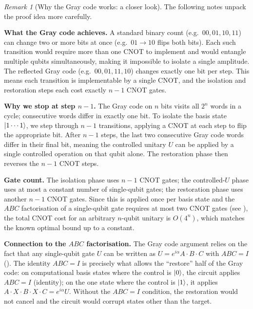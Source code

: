 \documentclass[12pt, a4paper, oneside]{report}
\theoremstyle{plain}
\theoremstyle{definition}
\theoremstyle{remark}
\newtheorem{remark}[theorem]{Remark}
\begin{document}
\begin{remark}[Why the Gray code works: a closer look]
	The following notes unpack the proof idea more carefully.

	\textbf{What the Gray code achieves.}
	A standard binary count (e.g.\ $00, 01, 10, 11$) can change two or more bits at once
	(e.g.\ $01 \to 10$ flips both bits). Each such transition would require more than one CNOT
	to implement and would entangle multiple qubits simultaneously, making it impossible to
	isolate a single amplitude. The reflected Gray code (e.g.\ $00, 01, 11, 10$) changes
	exactly one bit per step. This means each transition is implementable by a single CNOT,
	and the isolation and restoration steps each cost exactly $n-1$ CNOT gates.

	\textbf{Why we stop at step $n-1$.}
	The Gray code on $n$ bits visits all $2^n$ words in a cycle; consecutive words differ in
	exactly one bit. To isolate the basis state $\ket{1\cdots1}$, we step through $n-1$
	transitions, applying a CNOT at each step to flip the appropriate bit. After $n-1$ steps,
	the last two consecutive Gray code words differ in their final bit, meaning the controlled
	unitary $U$ can be applied by a single controlled operation on that qubit alone. The
	restoration phase then reverses the $n-1$ CNOT steps.

	\textbf{Gate count.}
	The isolation phase uses $n-1$ CNOT gates; the controlled-$U$ phase uses at most a constant
	number of single-qubit gates; the restoration phase uses another $n-1$ CNOT gates. Since
	this is applied once per basis state and the $ABC$ factorisation of a single-qubit gate
	requires at most two CNOT gates (see ), the total CNOT cost for an arbitrary
	$n$-qubit unitary is $O(4^n)$, which matches the known optimal bound up to a constant.

	\textbf{Connection to the $ABC$ factorisation.}
	The Gray code argument relies on the fact that any single-qubit gate $U$ can be written as
	$U = e^{i\alpha} A \cdot B \cdot C$ with $ABC = I$ (). The identity
	$ABC = I$ is precisely what allows the ``restore'' half of the Gray code: on computational
	basis states where the control is $\ket{0}$, the circuit applies $ABC = I$ (identity); on
	the one state where the control is $\ket{1}$, it applies
	$A \cdot X \cdot B \cdot X \cdot C = e^{i\alpha} U$. Without the $ABC = I$ condition, the
	restoration would not cancel and the circuit would corrupt states other than the target.
\end{remark}
\end{document}
